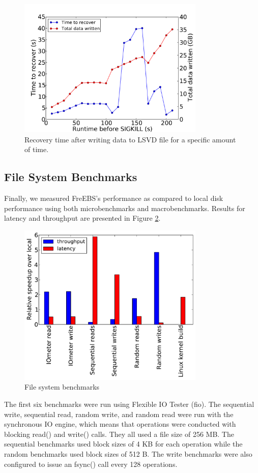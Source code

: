 \begin{figure}
  \centering
   \includegraphics[width=3.5in]{figures/checkpointing.pdf}
   \caption{Recovery time after writing data to LSVD file for a specific amount of time.}
   \label{fig:checkpointing}
\end{figure}

\subsection{File System Benchmarks}
Finally, we measured FreEBS's performance as compared to local disk performance using both microbenchmarks and macrobenchmarks. Results for latency and throughput are presented in Figure \ref{fig:benchmarks}.

\begin{figure}
  \centering
   \includegraphics[width=3.5in]{figures/benchmarks.pdf}
   \caption{File system benchmarks}
   \label{fig:benchmarks}
\end{figure}

The first six benchmarks were run using Flexible IO Tester (fio). The sequential write, sequential read, random write, and random read were run with the synchronous IO engine, which means that operations were conducted with blocking read() and write() calls. They all used a file size of 256 MB. The sequential benchmarks used block sizes of 4 KB for each operation while the random benchmarks used block sizes of 512 B. The write benchmarks were also configured to issue an fsync() call every 128 operations.

